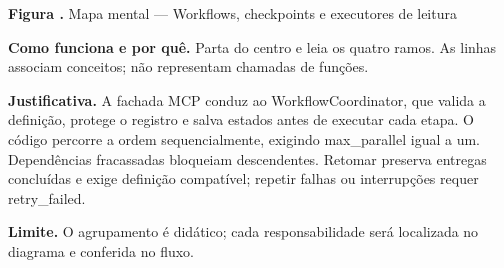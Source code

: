 {\small\textbf{Figura \thefigure.} Mapa mental --- Workflows, checkpoints e executores de leitura}\par\smallskip
\noindent\textbf{Como funciona e por quê.} Parta do centro e leia os quatro ramos. As linhas associam conceitos; não representam chamadas de funções.\par
\noindent\textbf{Justificativa.} A fachada MCP conduz ao WorkflowCoordinator, que valida a definição, protege o registro e salva estados antes de executar cada etapa. O código percorre a ordem sequencialmente, exigindo max\_parallel igual a um. Dependências fracassadas bloqueiam descendentes. Retomar preserva entregas concluídas e exige definição compatível; repetir falhas ou interrupções requer retry\_failed.\par
\noindent\textbf{Limite.} O agrupamento é didático; cada responsabilidade será localizada no diagrama e conferida no fluxo.\par\smallskip
{}
